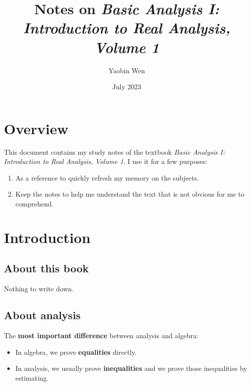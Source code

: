 \documentclass[12pt, letterpaper, oneside]{book}
\title{
  Notes on \textit{Basic Analysis I: Introduction to Real Analysis, Volume 1}
}
\author{Yaobin Wen}
\date{July 2023}
\begin{document}
\maketitle
\tableofcontents

\chapter*{Overview}

This document contains my study notes of the textbook \textit{Basic Analysis I:
  Introduction to Real Analysis, Volume 1}. I use it for a few purposes:

\begin{enumerate}
  \item As a reference to quickly refresh my memory on the subjects.
  \item Keep the notes to help me understand the text that is not obvious for
        me to comprehend.
\end{enumerate}

%
%

\chapter*{Introduction}

\section{About this book}

Nothing to write down.

\section{About analysis}

The \textbf{most important difference} between analysis and algebra:
\begin{itemize}
  \item In algebra, we prove \textbf{equalities} directly.
  \item In analysis, we usually prove \textbf{inequalities} and we prove those
        inequalities by estimating.
\end{itemize}
\end{document}
